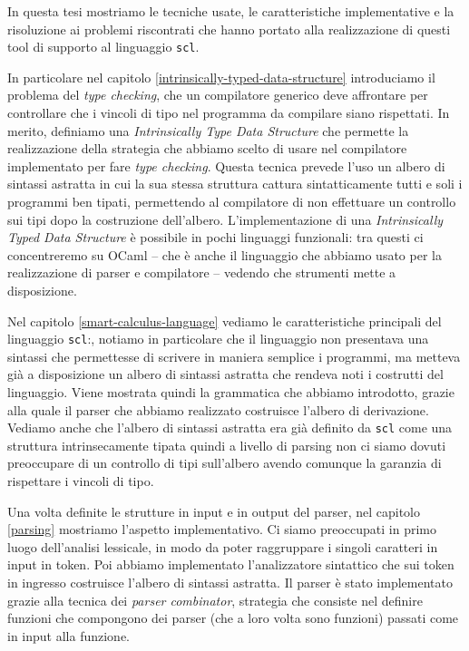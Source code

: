 \documentclass[12pt,a4paper]{report}
\begin{document}
In questa tesi mostriamo le tecniche usate, le caratteristiche
implementative e la risoluzione ai problemi riscontrati che hanno
portato alla realizzazione di questi tool di supporto al linguaggio
\texttt{scl}.

In particolare nel capitolo \ref{intrinsically-typed-data-structure}
introduciamo il problema del \emph{type checking}, che un compilatore
generico deve affrontare per controllare che i vincoli di tipo nel
programma da compilare siano rispettati. In merito, definiamo una
\emph{Intrinsically Type Data Structure} che permette la realizzazione
della strategia che abbiamo scelto di usare nel compilatore implementato
per fare \emph{type checking}. Questa tecnica prevede l'uso un albero di
sintassi astratta in cui la sua stessa struttura cattura sintatticamente
tutti e soli i programmi ben tipati, permettendo al compilatore di non
effettuare un controllo sui tipi dopo la costruzione dell'albero.
L'implementazione di una \emph{Intrinsically Typed Data Structure} è
possibile in pochi linguaggi funzionali: tra questi ci concentreremo su
OCaml -- che è anche il linguaggio che abbiamo usato per la
realizzazione di parser e compilatore -- vedendo che strumenti mette a
disposizione.

Nel capitolo \ref{smart-calculus-language} vediamo le caratteristiche
principali del linguaggio \texttt{scl}:, notiamo in particolare che il
linguaggio non presentava una sintassi che permettesse di scrivere in
maniera semplice i programmi, ma metteva già a disposizione un albero di
sintassi astratta che rendeva noti i costrutti del linguaggio. Viene
mostrata quindi la grammatica che abbiamo introdotto, grazie alla quale
il parser che abbiamo realizzato costruisce l'albero di derivazione.
Vediamo anche che l'albero di sintassi astratta era già definito da
\texttt{scl} come una struttura intrinsecamente tipata quindi a livello
di parsing non ci siamo dovuti preoccupare di un controllo di tipi
sull'albero avendo comunque la garanzia di rispettare i vincoli di tipo.

Una volta definite le strutture in input e in output del parser, nel
capitolo \ref{parsing} mostriamo l'aspetto implementativo. Ci siamo
preoccupati in primo luogo dell'analisi lessicale, in modo da poter
raggruppare i singoli caratteri in input in token. Poi abbiamo
implementato l'analizzatore sintattico che sui token in ingresso
costruisce l'albero di sintassi astratta. Il parser è stato implementato
grazie alla tecnica dei \emph{parser combinator}, strategia che consiste
nel definire funzioni che compongono dei parser (che a loro volta sono
funzioni) passati come in input alla funzione.
\end{document}
